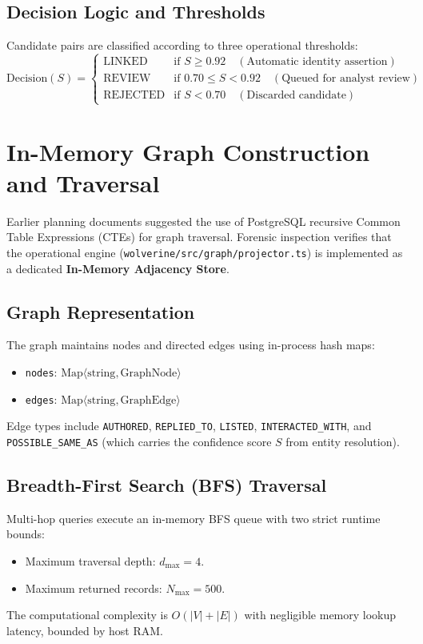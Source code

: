 \subsection{Decision Logic and Thresholds}
Candidate pairs are classified according to three operational thresholds:
\begin{equation}
\label{eq:decision-thresholds}
\text{Decision}(S) = \begin{cases} 
\text{LINKED} & \text{if } S \ge 0.92 \quad (\text{Automatic identity assertion}) \\
\text{REVIEW} & \text{if } 0.70 \le S < 0.92 \quad (\text{Queued for analyst review}) \\
\text{REJECTED} & \text{if } S < 0.70 \quad (\text{Discarded candidate})
\end{cases}
\end{equation}

\section{In-Memory Graph Construction and Traversal}
\label{sec:algo-graph}
Earlier planning documents suggested the use of PostgreSQL recursive Common Table Expressions (CTEs) for graph traversal. Forensic inspection verifies that the operational engine (\texttt{wolverine/src/graph/projector.ts}) is implemented as a dedicated \textbf{In-Memory Adjacency Store}.

\subsection{Graph Representation}
The graph maintains nodes and directed edges using in-process hash maps:
\begin{itemize}
    \item \texttt{nodes}: $\text{Map}\langle \text{string}, \text{GraphNode} \rangle$
    \item \texttt{edges}: $\text{Map}\langle \text{string}, \text{GraphEdge} \rangle$
\end{itemize}
Edge types include \texttt{AUTHORED}, \texttt{REPLIED\_TO}, \texttt{LISTED}, \texttt{INTERACTED\_WITH}, and \texttt{POSSIBLE\_SAME\_AS} (which carries the confidence score $S$ from entity resolution).

\subsection{Breadth-First Search (BFS) Traversal}
Multi-hop queries execute an in-memory BFS queue with two strict runtime bounds:
\begin{itemize}
    \item Maximum traversal depth: $d_{\max} = 4$.
    \item Maximum returned records: $N_{\max} = 500$.
\end{itemize}
The computational complexity is $O(|V| + |E|)$ with negligible memory lookup latency, bounded by host RAM.

